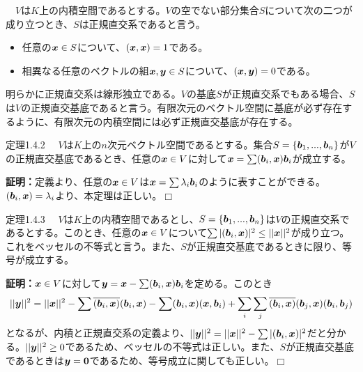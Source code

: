 \documentclass[dvipdfmx, 9pt, a4paper]{jsarticle}
\numberwithin{equation}{subsection}
\newcommand{\bm}[1]{{\mbox{\boldmath $#1$}}}
\def\qed{\hfill $\Box$}
\begin{document}
\begin{tcolorbox}[title=正規直交系]
　$V$は$K$上の内積空間であるとする。$V$の空でない部分集合$S$について次の二つが成り立つとき、$S$は正規直交系であると言う。
\begin{itemize}
\item 任意の$\bm x \in S$について、$(\bm x, \bm x)=1$である。
\item 相異なる任意のベクトルの組$\bm x, \bm y \in S$について、$(\bm x, \bm y)= 0$である。
\end{itemize}
\end{tcolorbox}\par
明らかに正規直交系は線形独立である。$V$の基底$S$が正規直交系でもある場合、$S$は$V$の正規直交基底であると言う。有限次元のベクトル空間に基底が必ず存在するように、有限次元の内積空間には必ず正規直交基底が存在する。
\begin{itembox}[l]{定理1.4.2}
　$V$は$K$上の$n$次元ベクトル空間であるとする。集合$S=\{ \bm b_1, ..., \bm b_n \}$が$V$の正規直交基底であるとき、任意の$\bm x \in V$に対して$\bm x=\sum (\bm b_i, \bm x)\bm b_i$が成立する。
\end{itembox}
{\bf 証明：}定義より、任意の$\bm x \in V$は$\bm x=\sum \lambda_i \bm b_i$のように表すことができる。$(\bm b_i, \bm x)=\lambda_i$より、本定理は正しい。\qed
\begin{itembox}[l]{定理1.4.3}
　$V$は$K$上の内積空間であるとし、$S=\{\bm b_1, ..., \bm b_n\}$は$V$の正規直交系であるとする。このとき、任意の$\bm x \in V$について$\sum|(\bm b_i, \bm x)|^2 \leq ||\bm x||^2$が成り立つ。これをベッセルの不等式と言う。また、$S$が正規直交基底であるときに限り、等号が成立する。
\end{itembox}
{\bf 証明：}$\bm x \in V$に対して$\bm y=\bm x-\sum(\bm b_i, \bm x)\bm b_i$を定める。このとき
\begin{equation}
||\bm y||^2=||\bm x||^2-\sum \overline{(\bm b_i, \bm x)}(\bm b_i, \bm x)-\sum (\bm b_i, \bm x)(\bm x, \bm b_i)+\sum_i\sum_j\overline{(\bm b_i, \bm x)}(\bm b_j, \bm x)(\bm b_i, \bm b_j) \notag
\end{equation}
となるが、内積と正規直交系の定義より、$||\bm y||^2=||\bm x||^2-\sum|(\bm b_i, \bm x)|^2$だと分かる。$||\bm y||^2 \geq 0$であるため、ベッセルの不等式は正しい。また、$S$が正規直交基底であるときは$\bm y=\bm 0$であるため、等号成立に関しても正しい。\qed
\end{document}
